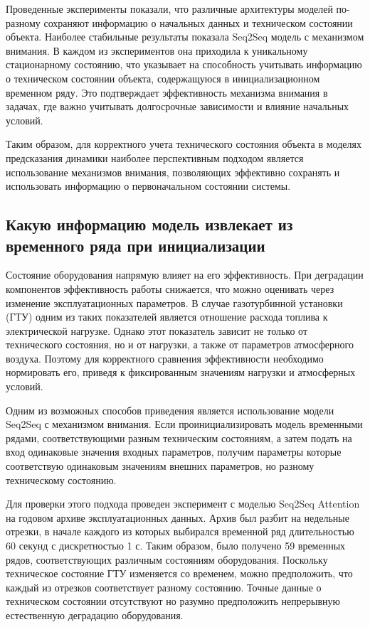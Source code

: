 \documentclass[12pt,a4paper]{article}
\begin{document}
Проведенные эксперименты показали, что различные архитектуры моделей по-разному сохраняют информацию о начальных данных и техническом состоянии объекта. Наиболее стабильные результаты показала Seq2Seq модель с механизмом внимания. В каждом из экспериментов она приходила к уникальному стационарному состоянию, что указывает на способность учитывать информацию о техническом состоянии объекта, содержащуюся в инициализационном временном ряду. Это подтверждает эффективность механизма внимания в задачах, где важно учитывать долгосрочные зависимости и влияние начальных условий.

Таким образом, для корректного учета технического состояния объекта в моделях предсказания динамики наиболее перспективным подходом является использование механизмов внимания, позволяющих эффективно сохранять и использовать информацию о первоначальном состоянии системы.


\newpage
\subsection{Какую информацию модель извлекает из временного ряда при инициализации}


Состояние оборудования напрямую влияет на его эффективность. При деградации компонентов эффективность работы снижается, что можно оценивать через изменение эксплуатационных параметров. В случае газотурбинной установки (ГТУ) одним из таких показателей является отношение расхода топлива к электрической нагрузке. Однако этот показатель зависит не только от технического состояния, но и от нагрузки, а также от параметров атмосферного воздуха. Поэтому для корректного сравнения эффективности необходимо нормировать его, приведя к фиксированным значениям нагрузки и атмосферных условий.

Одним из возможных способов приведения является использование модели Seq2Seq с механизмом внимания. Если проинициализировать модель временными рядами, соответствующими разным техническим состояниям, а затем подать на вход одинаковые значения входных параметров, получим параметры которые соответствую одинаковым значениям внешних параметров, но разному техническому состоянию.

Для проверки этого подхода проведен эксперимент с моделью Seq2Seq Attention на годовом архиве эксплуатационных данных. Архив был разбит на недельные отрезки, в начале каждого из которых выбирался временной ряд длительностью 60 секунд с дискретностью 1 с. Таким образом, было получено 59 временных рядов, соответствующих различным состояниям оборудования. Поскольку техническое состояние ГТУ изменяется со временем, можно предположить, что каждый из отрезков соответствует разному состоянию. Точные данные о техническом состоянии отсутствуют но разумно предположить непрерывную естественную деградацию оборудования.
\end{document}
